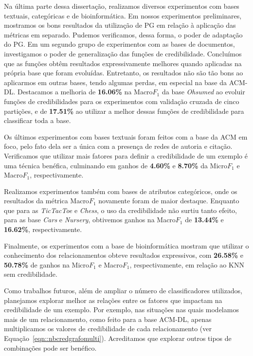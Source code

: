 Na última parte dessa dissertação, realizamos diversos experimentos com bases textuais, categóricas e de bioinformática. Em nossos experimentos preliminares, mostramos os bons resultados da utilização de \textsc{PG} em relação à aplicação das métricas em separado. Pudemos verificamos, dessa forma, o poder de adaptação do \textsc{PG}.
Em um segundo grupo de experimentos com as bases de documentos, investigamos o poder de generalização das funções de credibilidade. Concluímos que as funções obtêm resultados expressivamente melhores quando aplicadas na própria base que foram evoluídas. Entretanto, os resultados não são tão bons ao aplicarmos em outras bases, tendo algumas perdas, em especial na base da \textsc{ACM-DL}.
Destacamos a melhoria de \textbf{16.06\%} na Macro$F_1$ da base \textit{Ohsumed} ao evoluir funções de credibilidades para os experimentos com validação cruzada de cinco partições, e de
\textbf{17.51\%} ao utilizar a melhor dessas funções de credibilidade para classificar toda a base.

Os últimos experimentos com bases textuais foram feitos com a base da \textsc{ACM} em foco, pelo fato dela ser a única com a presença de redes de autoria e citação. Verificamos que utilizar mais fatores para definir a credibilidade de um exemplo é uma técnica benéfica, culminando em ganhos de \textbf{4.60\%} e \textbf{8.70\%} da Micro$F_1$ e Macro$F_1$, respectivamente.

Realizamos experimentos também com bases de atributos categóricos, onde os resultados da métrica Macro$F_1$ novamente foram de maior destaque. Enquanto que para as \textit{TicTacToe} e \textit{Chess}, o uso da credibilidade não surtiu tanto efeito, para as base \textit{Cars} e \textit{Nursery}, obtivemos ganhos na Macro$F_1$ de \textbf{13.44\%} e \textbf{16.62\%}, respectivamente.

Finalmente, os experimentos com a base de bioinformática mostram que utilizar o conhecimento dos relacionamentos obteve resultados expressivos, com \textbf{26.58\%} e \textbf{50.78\%} de ganhos na Micro$F_1$ e Macro$F_1$,
respectivamente,
em relação ao \textsc{KNN} sem credibilidade.

Como trabalhos futuros, além de ampliar o número de classificadores utilizados, planejamos explorar melhor as relações entre os fatores que impactam na credibilidade de um exemplo. Por exemplo, nas situações nas quais modelamos mais de um relacionamento, como feito para a base \textsc{ACM-DL}, apenas multiplicamos os valores de credibilidade de cada relacionamento (ver Equação~\ref{eqn::nbcredgrafomulti}). Acreditamos que explorar outros tipos de combinações pode ser benéfico.


